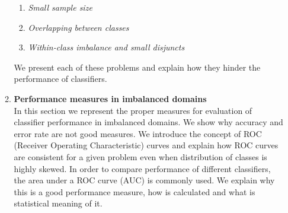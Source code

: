 \documentclass[a4paper]{article}
\begin{document}
\begin{enumerate}[I]
\begin{enumerate}[1.]
		\begin{enumerate}
		\item \textit{Small sample size}
		\item \textit{Overlapping between classes}
		\item \textit{Within-class imbalance and small disjuncts}
		\end{enumerate}
We present each of these problems and explain how they hinder the performance of classifiers.
	\item \textbf{Performance measures in imbalanced domains}\\
In this section we represent the proper measures for evaluation of classifier performance in imbalanced domains. We show why accuracy and error rate are not good measures. We introduce the concept of ROC (Receiver Operating Characteristic) curves and explain how ROC curves are consistent for a given problem even when distribution of classes is highly skewed. In order to compare performance of different classifiers, the area under a ROC curve (AUC) is commonly used. We explain why this is a good performance measure, how is calculated and what is statistical meaning of it. 
	\end{enumerate}


\end{enumerate}
\end{document}
